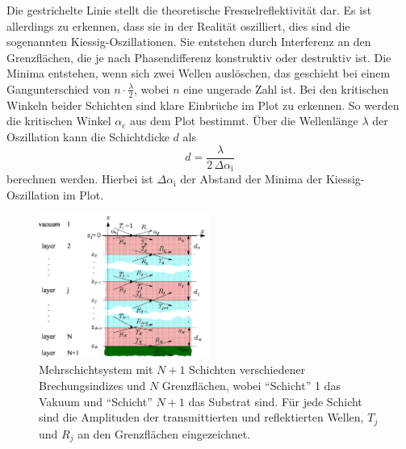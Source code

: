 Die gestrichelte Linie stellt die theoretische Fresnelreflektivität dar.
Es ist allerdings zu erkennen, dass sie in der Realität oszilliert, dies sind die sogenannten Kiessig-Oszillationen. 
Sie entstehen durch Interferenz an den Grenzflächen, die je nach Phasendifferenz konstruktiv oder destruktiv ist.
Die Minima entstehen, wenn sich zwei Wellen auslöschen, das geschieht bei einem Gangunterschied von $ n \cdot \frac{\lambda}{2}$, wobei $n$ eine ungerade Zahl ist.
Bei den kritischen Winkeln beider Schichten sind klare Einbrüche im Plot zu erkennen.
So werden die kritischen Winkel $\alpha _\text{c}$ aus dem Plot bestimmt.
Über die Wellenlänge $\lambda$ der Oszillation kann die Schichtdicke $d$ als 
\begin{equation}
    d = \frac{\lambda}{2 \, \Delta \alpha _\text{i}}
    \label{eq:schicht}
\end{equation}
berechnen werden.
Hierbei ist $\Delta \alpha _\text{i}$ der Abstand der Minima der Kiessig-Oszillation im Plot.

\begin{figure}
    \centering
    \includegraphics[width=0.5\textwidth]{images/parratt_algorithmus.png}
    \caption{Mehrschichtsystem mit $N + 1$ Schichten verschiedener Brechungsindizes und $N$ Grenzflächen,
    wobei \enquote{Schicht} 1 das Vakuum und \enquote{Schicht} $N + 1$ das Substrat sind. Für jede
    Schicht sind die Amplituden der transmittierten und reflektierten Wellen, $T_j$ und $R_j$ an den
    Grenzflächen eingezeichnet.\cite{V44old}}
    \label{fig:parrat}
\end{figure}

